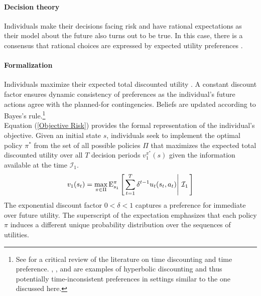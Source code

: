 \paragraph{Decision theory} Individuals make their decisions facing risk and have rational expectations \citep{Muth.1961,Lucas.1972} as their model about the future also turns out to be true. In this case, there is a consensus that rational choices are expressed by expected utility preferences \citep{Bernoulli.1738,Neumann.1944,Neumann.1947}.

\paragraph{Formalization} Individuals maximize their expected total discounted utility \citep{Samuelson.1937,Koopmans.1960}. A constant discount factor ensures dynamic consistency of preferences as the individual's future actions agree with the planned-for contingencies. Beliefs are updated according to Bayes's rule.\footnote{See \citet{Frederick.2002} for a critical review of the literature on time discounting and time preference. \citet{Fang.2009}, \citet{Fang.2015}, and \citet{Chan.2017} are examples of hyperbolic discounting and thus potentially time-inconsistent preferences in settings similar to the one discussed here.}\\

Equation (\ref{Objective Risk}) provides the formal representation of the individual's objective. Given an initial state $s$, individuals seek to implement the optimal policy $\pi^*$ from the set of all possible policies $\Pi$ that maximizes the expected total discounted utility over all $T$ decision periods $v^{\pi^*}_1(s)$ given the information available at the time $\mathcal{I}_1$.
%
\begin{align}\label{Objective Risk}
v_1(s_t) = \max_{\pi \in\Pi} \mathrm{E}_{s_1}^\pi\left[\left.\sum^{T}_{t = 1}  \delta^{t - 1} u_t(s_t, a_t) \right\vert\,\mathcal{I}_1\,\right]
\end{align}
%
The exponential discount factor $0 < \delta < 1$ captures a preference for immediate over future utility. The superscript of the expectation emphasizes that each policy $\pi$ induces a different unique probability distribution over the sequences of utilities.
